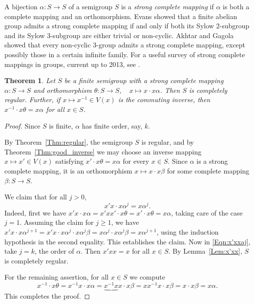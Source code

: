 \documentclass[11pt]{article}
\theoremstyle{plain}
\newtheorem{theorem}{Theorem}[section]
\theoremstyle{remark}
\theoremstyle{definition}
\theoremstyle{plain}
\newcommand{\inv}{^{-1}}
\begin{document}
A bijection $\alpha\colon S\to S$ of a semigroup $S$ is a \emph{strong complete mapping} if $\alpha$ is both a complete mapping and an orthomorphism.
Evans \cite[Theorem~15]{evans3} showed that a finite abelian group admits a strong complete mapping if and only if both its Sylow $2$-subgroup and its Sylow $3$-subgroup are either trivial or non-cyclic. Akhtar and Gagola \cite[Abstract]{ag}
showed that every non-cyclic $3$-group admits a strong complete mapping, except possibly those in a certain infinite family. For a useful survey of strong complete mappings in groups, current up to 2013, see \cite{evans4}.

\begin{theorem}\label{Thm:strong-CR}
Let $S$ be a finite semigroup with a strong complete mapping $\alpha\colon S\to S$ and orthomorphism $\theta\colon S\to S,\quad x\mapsto x\cdot x\alpha$.
Then $S$ is completely regular. Further, if $x\mapsto x\inv\in V(x)$ is the commuting inverse, then $x\inv\cdot x\theta = x\alpha$
for all $x\in S$.
\end{theorem}
\begin{proof}
Since $S$ is finite, $\alpha$ has finite order, say, $k$.

By Theorem~\ref{Thm:regular}, the semigroup $S$ is regular, and by Theorem~\ref{Thm:good_inverse} we may choose an inverse mapping $x\mapsto x'\in V(x)$ satisfying $x'\cdot x\theta=x\alpha$ for every $x\in S$. Since $\alpha$ is a strong complete mapping, it is an orthomorphism $x\mapsto x\cdot x\beta$ for some complete mapping $\beta\colon S\to S$.

We claim that for all $j>0$,
\begin{equation}\label{Eqn:x'xxaj}
x'x\cdot x\alpha^j = x\alpha^j.
\end{equation}
Indeed, first we have $x'x\cdot x\alpha = x'xx'\cdot x\theta = x'\cdot x\theta = x\alpha$,
taking care of the case $j=1$. Assuming the claim for $j\ge 1$, we have $x'x\cdot x\alpha^{j+1} = x'x\cdot x\alpha^j \cdot x\alpha^j\beta =
x\alpha^j\cdot x\alpha^j\beta = x\alpha^{j+1}$, using the induction hypothesis in the second equality. This establishes the claim. Now in \eqref{Eqn:x'xxaj}, take $j=k$, the
order of $\alpha$. Then $x'xx = x$ for all $x\in S$. By Lemma~\ref{Lem:x'xx}, $S$ is completely regular.

For the remaining assertion, for all $x\in S$ we compute
\[
x\inv\cdot x\theta = x\inv x\cdot x\alpha = \underbrace{x\inv x}x\cdot x\beta = xx\inv x\cdot x\beta = x\cdot x\beta = x\alpha.
\]
This completes the proof.
\end{proof}
\end{document}
